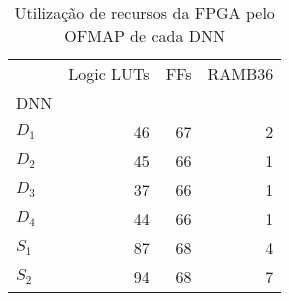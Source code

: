 \begin{table}[ht!]
\centering
\caption{Utilização de recursos da FPGA pelo OFMAP de cada DNN}
\label{tab:5-vivado-ofmap}
\begin{tabular}{lrrr}
\toprule
 & Logic LUTs & FFs & RAMB36 \\
DNN &  &  &  \\
\midrule
$D_1$ &         46 &   67 &      2 \\
$D_2$ &         45 &   66 &      1 \\
$D_3$ &         37 &   66 &      1 \\
$D_4$ &         44 &   66 &      1 \\
$S_1$ &         87 &   68 &      4 \\
$S_2$ &         94 &   68 &      7 \\
\bottomrule
\end{tabular}
\end{table}
